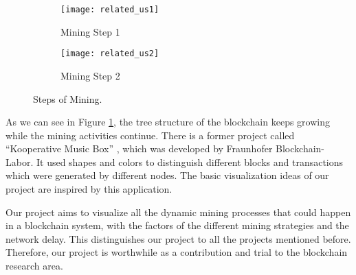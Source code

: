 \begin{figure}[htb]
    \centering
    \begin{subfigure}[b]{1\textwidth}
        \centering
        \texttt{[image: related\_us1]}
        \caption{Mining Step 1}
    \end{subfigure}

    \begin{subfigure}[b]{1\textwidth}
        \centering
        \texttt{[image: related\_us2]}
        \caption{Mining Step 2}
    \end{subfigure}

    \caption{Steps of Mining.}
    \label{fig:steps of mining}
\end{figure}

As we can see in Figure \ref{fig:steps of mining}, the tree structure of the blockchain keeps growing while the mining activities continue. There is a former project called “Kooperative Music Box” \cite{musicbox}, which was developed by Fraunhofer Blockchain-Labor. It used shapes and colors to distinguish different blocks and transactions which were generated by different nodes. The basic visualization ideas of our project are inspired by this application.

Our project aims to visualize all the dynamic mining processes that could happen in a blockchain system, with the factors of the different mining strategies and the network delay. This distinguishes our project to all the projects mentioned before. Therefore, our project is worthwhile as a contribution and trial to the blockchain research area.
